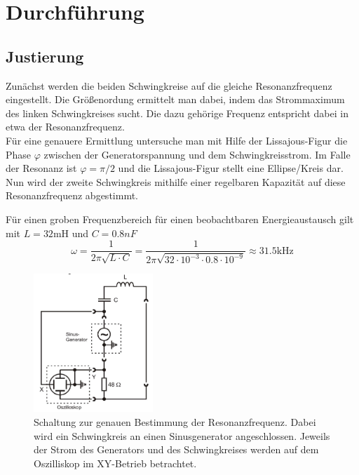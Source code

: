 \newpage
\section{Durchführung}
\subsection{Justierung}
Zunächst werden die beiden Schwingkreise auf die gleiche Resonanzfrequenz eingestellt.
Die Größenordung ermittelt man dabei, indem das Strommaximum des linken Schwingkreises sucht.
Die dazu gehörige Frequenz entspricht dabei in etwa der Resonanzfrequenz.\\
Für eine genauere Ermittlung untersuche man mit Hilfe der Lissajous-Figur die Phase $\varphi$
zwischen der Generatorspannung und dem Schwingkreisstrom. Im Falle der Resonanz ist $\varphi=\pi/2$ 
und die Lissajous-Figur stellt eine Ellipse/Kreis dar.
Nun wird der zweite Schwingkreis mithilfe einer regelbaren Kapazität auf diese Resonanzfrequenz
abgestimmt.\newline

Für einen groben Frequenzbereich für einen beobachtbaren Energieaustausch gilt 
mit $L=32$mH und $C=0.8nF$
\begin{equation}
    \omega = \frac{1}{2 \pi \sqrt{L\cdot C}} = \frac{1}{2 \pi \sqrt{32\cdot 10^{-3}\cdot 0.8\cdot 10^{-9}}}\approx 31.5\text{kHz} 
\end{equation}   
\begin{figure}
    \centering
    \includegraphics[width=0.4\textwidth]{bilder/justierung.jpg}
    \caption{
        Schaltung zur genauen Bestimmung der Resonanzfrequenz.
        Dabei wird ein Schwingkreis an einen Sinusgenerator angeschlossen.
        Jeweils der Strom des Generators und des Schwingkreises werden auf 
        dem Oszilliskop im XY-Betrieb betrachtet. \cite[305]{Anleitung}
    }
    \label{fig:justierung}
\end{figure}


